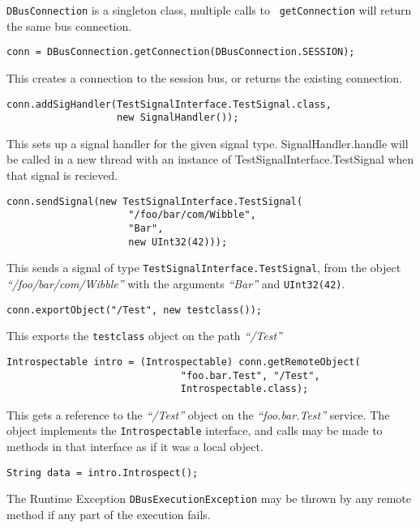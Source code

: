 \documentclass[a4paper,12pt]{article}
\begin{document}
{\tt DBusConnection} is a singleton class, multiple calls to {\tt
getConnection} will return the same bus connection. 

\begin{verbatim}
conn = DBusConnection.getConnection(DBusConnection.SESSION);
\end{verbatim}

This creates a connection to the session bus, or returns the
existing connection.

\begin{verbatim}
conn.addSigHandler(TestSignalInterface.TestSignal.class,
                   new SignalHandler());
\end{verbatim}

This sets up a signal handler for the given signal type.
SignalHandler.handle will be called in a new thread with an instance
of TestSignalInterface.TestSignal when that signal is recieved.

\begin{verbatim}
conn.sendSignal(new TestSignalInterface.TestSignal(
                     "/foo/bar/com/Wibble", 
                     "Bar", 
                     new UInt32(42)));
\end{verbatim}

This sends a signal of type {\tt TestSignalInterface.TestSignal},
from the object {\em ``/foo/bar/com/Wibble''} with the arguments {\em
``Bar''} and {\tt UInt32(42)}.

\begin{verbatim}
conn.exportObject("/Test", new testclass());
\end{verbatim}

This exports the {\tt testclass} object on the path {\em ``/Test''}

\begin{verbatim}
Introspectable intro = (Introspectable) conn.getRemoteObject(
                              "foo.bar.Test", "/Test",
                              Introspectable.class);
\end{verbatim}

This gets a reference to the {\em ``/Test''} object on the {\em
``foo.bar.Test''} service. The object implements the {\tt Introspectable}
interface, and calls may be made to methods in that interface as if it was a
local object.

\begin{verbatim}
String data = intro.Introspect();
\end{verbatim}

The Runtime Exception {\tt DBusExecutionException} may be thrown
by any remote method if any part of the execution fails.
\end{document}
